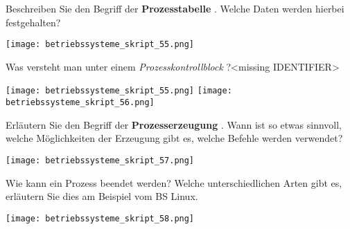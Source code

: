 \documentclass{article}
\begin{document}
\begin{tcolorbox}[colback=white!10!white,colframe=lightgray!75!black,
  savelowerto=\jobname_ex.tex,breakable,enhanced,lines before break=40]

\begin{center}
Beschreiben Sie den Begriff der 
\textbf{Prozesstabelle
}.
Welche Daten werden hierbei festgehalten?

\end{center}

\tcblower

\justifying
\texttt{[image: betriebssysteme\_skript\_55.png]}

\end{tcolorbox}
\begin{tcolorbox}[colback=white!10!white,colframe=lightgray!75!black,
  savelowerto=\jobname_ex.tex,breakable,enhanced,lines before break=40]

\begin{center}
Was versteht man unter einem 
\textit{Prozesskontrollblock
}?<missing IDENTIFIER>

\end{center}

\tcblower

\justifying
\texttt{[image: betriebssysteme\_skript\_55.png]}
\texttt{[image: betriebssysteme\_skript\_56.png]}

\end{tcolorbox}
\begin{tcolorbox}[colback=white!10!white,colframe=lightgray!75!black,
  savelowerto=\jobname_ex.tex,breakable,enhanced,lines before break=40]

\begin{center}
Erläutern Sie den Begriff der 
\textbf{Prozesserzeugung
}. 
Wann ist so etwas sinnvoll, welche Möglichkeiten der Erzeugung gibt es, welche Befehle werden verwendet?

\end{center}

\tcblower

\justifying
\texttt{[image: betriebssysteme\_skript\_57.png]}

\end{tcolorbox}
\begin{tcolorbox}[colback=white!10!white,colframe=lightgray!75!black,
  savelowerto=\jobname_ex.tex,breakable,enhanced,lines before break=40]

\begin{center}
Wie kann ein Prozess beendet werden?
Welche unterschiedlichen Arten gibt es, erläutern Sie dies am Beispiel vom BS Linux.

\end{center}

\tcblower

\justifying
\texttt{[image: betriebssysteme\_skript\_58.png]}

\end{tcolorbox}
\end{document}
